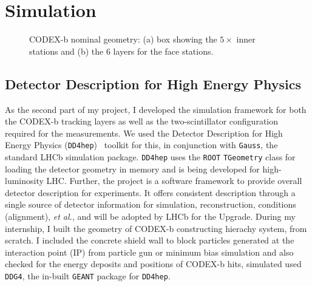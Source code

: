 \section{Simulation}
\label{sec:Simulation}

\begin{figure}
\centering
{}
\caption{\label{fig:nom_geo_cartoon}
    CODEX-b nominal geometry: (a) box showing the $5\times$ inner stations and (b) the 6 layers for the face stations. 
}
\end{figure}


\subsection{Detector Description for High Energy Physics}
As the second part of my project, I developed the simulation framework for both the CODEX-b tracking layers as well as the two-scintillator configuration required for the measurements. We used the Detector Description for High Energy Physics ({\tt DD4hep})~\cite{dd4hep} toolkit for this, in conjunction with {\tt Gauss}, the standard LHCb simulation package. {\tt DD4hep} uses the {\tt ROOT} {\tt TGeometry} class for loading the detector geometry in memory and is being developed for high-luminosity LHC. Further, the project is a software framework to provide overall detector description for experiments. It offers consistent description through a single source of detector information for simulation, reconstruction, conditions (alignment), {\em et al.}, and will be adopted by LHCb for the Upgrade. During my internship, I built the geometry of CODEX-b constructing hierachy system, from scratch. I included the concrete shield wall to block particles generated at the interaction point (IP) from particle gun or minimum bias simulation and also checked for the energy deposits and positions of CODEX-b hits, simulated used {\tt DDG4}, the in-built {\tt GEANT} package for {\tt DD4hep}. 

